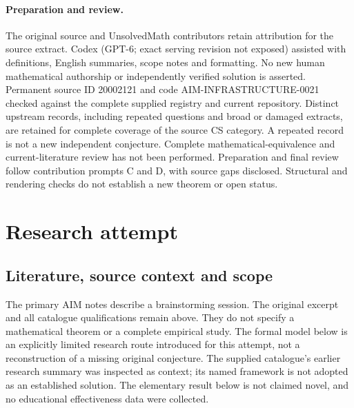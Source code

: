 \documentclass[11pt]{article}
\begin{document}
\paragraph{Preparation and review.}
The original source and UnsolvedMath contributors retain attribution for the source extract. Codex (GPT-6; exact serving revision not exposed) assisted with definitions, English summaries, scope notes and formatting. No new human mathematical authorship or independently verified solution is asserted. Permanent source ID 20002121 and code AIM-INFRASTRUCTURE-0021 checked against the complete supplied registry and current repository. Distinct upstream records, including repeated questions and broad or damaged extracts, are retained for complete coverage of the source CS category. A repeated record is not a new independent conjecture. Complete mathematical-equivalence and current-literature review has not been performed. Preparation and final review follow contribution prompts C and D, with source gaps disclosed. Structural and rendering checks do not establish a new theorem or open status.
\label{end:20002121}

\section{Research attempt}
\subsection{Literature, source context and scope}
The primary AIM notes describe a brainstorming session. The original excerpt and all catalogue qualifications remain above. They do not specify a mathematical theorem or a complete empirical study. The formal model below is an explicitly limited research route introduced for this attempt, not a reconstruction of a missing original conjecture. The supplied catalogue's earlier research summary was inspected as context; its named framework is not adopted as an established solution. The elementary result below is not claimed novel, and no educational effectiveness data were collected.
\end{document}
